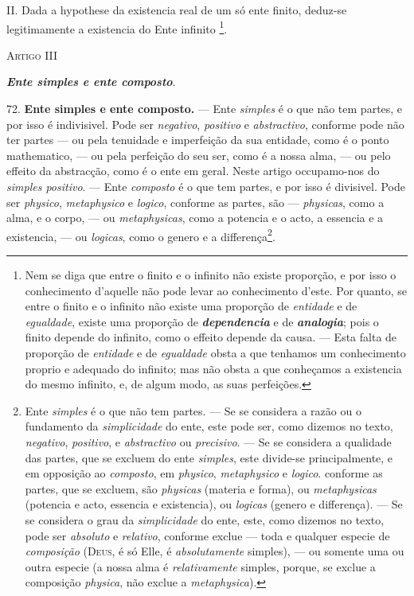  II. Dada a hypothese da existencia real de um só ente finito, deduz-se legitimamente a existencia do Ente infinito \footnote{Nem se diga que entre o finito e o infinito não existe proporção, e por isso o conhecimento d'aquelle não pode levar ao conhecimento d'este. Por quanto, se entre o finito e o infinito não existe uma proporção de \emph{entidade} e de \emph{egualdade}, existe uma proporção de \textbf{\emph{dependencia}} e de \textbf{\emph{analogia}}; pois o finito depende do infinito, como o effeito depende da causa. --- Esta falta de proporção de \emph{entidade} e de \emph{egualdade} obsta a que tenhamos um conhecimento proprio e adequado do infinito; mas não obsta a que conheçamos a existencia do mesmo infinito, e, de algum modo, as suas perfeições.}.

\textsc{Artigo III}

\textbf{\emph{Ente simples e ente composto}}.

72. \textbf{Ente simples e ente composto.} --- Ente \emph{simples} é o que não tem partes, e por isso é indivisivel. Pode ser \emph{negativo}, \emph{positivo} e \emph{abstractivo}, conforme pode não ter partes --- ou pela tenuidade e imperfeição da sua entidade, como é o ponto mathematico, --- ou pela perfeição do seu ser, como é a nossa alma, --- ou pelo effeito da abstracção, como é o ente em geral. Neste artigo occupamo-nos do \emph{simples positivo}. --- Ente \emph{composto} é o que tem partes, e por isso é divisivel. Pode ser \emph{physico}, \emph{metaphysico} e \emph{logico}, conforme as partes, são --- \emph{physicas}, como a alma, e o corpo, --- ou \emph{metaphysicas}, como a potencia e o acto, a essencia e a existencia, --- ou \emph{logicas}, como o genero e a differença\footnote{Ente \emph{simples} é o que não tem partes. --- Se se considera a razão ou o fundamento da \emph{simplicidade} do ente, este pode ser, como dizemos no texto, \emph{negativo}, \emph{positivo}, e \emph{abstractivo} ou \emph{precisivo}. --- Se se considera a qualidade das partes, que se excluem do ente \emph{simples}, este divide-se principalmente, e em opposição ao \emph{composto}, em \emph{physico}, \emph{metaphysico} e \emph{logico}. conforme as partes, que se excluem, são \emph{physicas} (materia e forma), ou \emph{metaphysicas} (potencia e acto, essencia e existencia), ou \emph{logicas} (genero e differença). --- Se se considera o grau da \emph{simplicidade} do ente, este, como dizemos no texto, pode ser \emph{absoluto} e \emph{relativo}, conforme exclue --- toda e qualquer especie de \emph{composição} (\textsc{Deus}, é só Elle, é \emph{absolutamente} simples), --- ou somente uma ou outra especie (a nossa alma é \emph{relativamente} simples, porque, se exclue a composição \emph{physica}, não exclue a \emph{metaphysica}).}.


